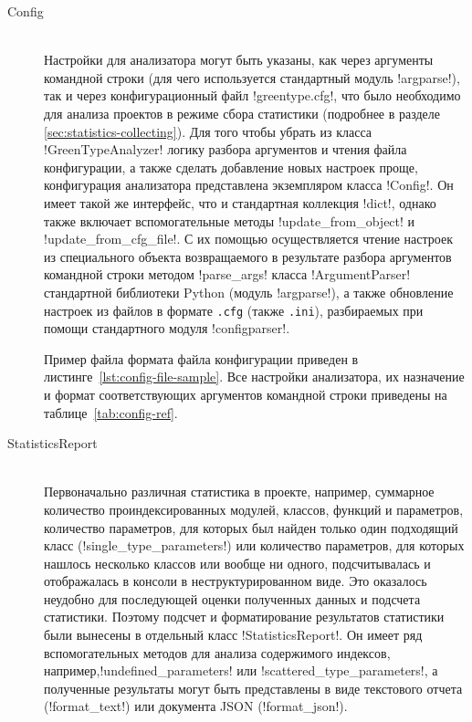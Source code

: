 \begin{description}
  \item[Config] \hfill \\
    Настройки для анализатора могут быть указаны, как через аргументы командной
    строки (для чего используется стандартный модуль !argparse!), так и через
    конфигурационный файл !greentype.cfg!, что было необходимо для анализа
    проектов в режиме сбора статистики (подробнее в разделе
    \ref{sec:statistics-collecting}). Для того чтобы убрать из класса
    !GreenTypeAnalyzer! логику разбора аргументов и чтения файла конфигурации, а
    также сделать добавление новых настроек проще, конфигурация анализатора
    представлена экземпляром класса !Config!. Он имеет такой же интерфейс, что и
    стандартная коллекция !dict!, однако также включает вспомогательные методы
    !update_from_object! и !update_from_cfg_file!. С их помощью осуществляется
    чтение настроек из специального объекта возвращаемого в результате разбора
    аргументов командной строки методом !parse_args! класса
    !ArgumentParser! стандартной библиотеки Python (модуль !argparse!), а также
    обновление настроек из файлов в формате \texttt{.cfg} (также \texttt{.ini}),
    разбираемых при помощи стандартного модуля !configparser!.
    
    Пример файла формата файла конфигурации приведен в
    листинге~\ref{lst:config-file-sample}. Все настройки анализатора, их
    назначение и формат соответствующих аргументов командной строки приведены на
    таблице~\ref{tab:config-ref}.

  \item[StatisticsReport] \hfill \\
    Первоначально различная статистика в проекте, например, суммарное количество
    проиндексированных модулей, классов, функций и параметров, количество
    параметров, для которых был найден только один подходящий класс
    (!single_type_parameters!) или количество параметров, для которых нашлось
    несколько классов или вообще ни одного, подсчитывалась и отображалась в
    консоли в неструктурированном виде. Это оказалось неудобно для
    последующей оценки полученных данных и подсчета статистики. Поэтому подсчет
    и форматирование результатов статистики были вынесены в отдельный класс
    !StatisticsReport!. Он имеет ряд вспомогательных методов для анализа
    содержимого индексов, например,!undefined_parameters!  или
    !scattered_type_parameters!, а полученные результаты могут быть
    представлены в виде текстового отчета (!format_text!) или документа JSON
    (!format_json!). 

  
\end{description}

